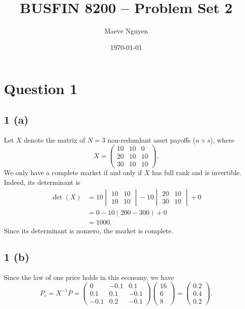 \documentclass[11pt]{article}
\title{BUSFIN 8200 -- Problem Set 2}
\author{Maeve Nguyen}
\date{\today}
\begin{document}
\maketitle

\section*{Question 1}

\subsection*{1 (a)}
Let $X$ denote the matrix of $N=3$ non-redundant asset payoffs
($n\times s$), where
\[
X=
\begin{pmatrix}
10 & 10 & 0 \\
20 & 10 & 10 \\
30 & 10 & 10
\end{pmatrix}.
\]
We only have a complete market if and only if $X$ has full rank and is
invertible. Indeed, its determinant is
\begin{align*}
\det(X)
&=
10
\begin{vmatrix}
10 & 10 \\
10 & 10
\end{vmatrix}
-10
\begin{vmatrix}
20 & 10 \\
30 & 10
\end{vmatrix}
+0 \\
&=0-10(200-300)+0 \\
&=1000.
\end{align*}
Since its determinant is nonzero, the market is complete.

\subsection*{1 (b)}
Since the law of one price holds in this economy, we have
\[
P_c=X^{-1} P
=
\begin{pmatrix}
0 & -0.1 & 0.1 \\
0.1 & 0.1 & -0.1 \\
-0.1 & 0.2 & -0.1
\end{pmatrix}
\begin{pmatrix}
16 \\
6 \\
8
\end{pmatrix}
=
\begin{pmatrix}
0.2 \\
0.4 \\
0.2
\end{pmatrix}.
\]
\end{document}
